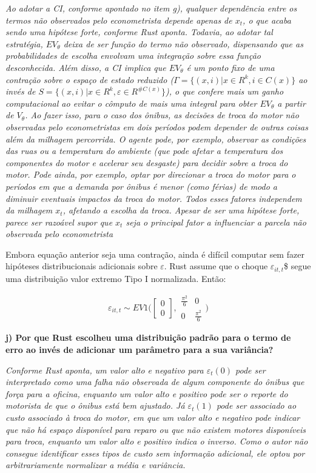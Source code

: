 \documentclass[12pt,a4paper]{article}
\begin{document}
\emph{Ao adotar a CI, conforme apontado no item g), qualquer dependência
entre os termos não observados pelo econometrista depende apenas de
\(x_t\), o que acaba sendo uma hipótese forte, conforme Rust aponta.
Todavia, ao adotar tal estratégia, \(EV_\theta\) deixa de ser função do
termo não observado, dispensando que as probabilidades de escolha
envolvam uma integração sobre essa função desconhecida. Além disso, a CI
implica que \(EV_\theta\) é um ponto fixo de uma contração sobre o
espaço de estado reduzido (\(\Gamma=\{(x,i)|x\in R^k, i \in C(x)\}\) ao
invés de \(S=\{(x,i)|x\in R^k, \varepsilon \in R^{\#C(x)}\}\)), o que
confere mais um ganho computacional ao evitar o cômputo de mais uma
integral para obter \(EV_\theta\) a partir de \(V_\theta\). Ao fazer
isso, para o caso dos ônibus, as decisões de troca do motor não
observadas pelo econometristas em dois períodos podem depender de outras
coisas além da milhagem percorrida. O agente pode, por exemplo, observar
as condições das ruas ou a temperatura do ambiente (que pode afetar a
temperatura dos componentes do motor e acelerar seu desgaste) para
decidir sobre a troca do motor. Pode ainda, por exemplo, optar por
direcionar a troca do motor para o períodos em que a demanda por ônibus
é menor (como férias) de modo a diminuir eventuais impactos da troca do
motor. Todos esses fatores independem da milhagem \(x_t\), afetando a
escolha da troca. Apesar de ser uma hipótese forte, parece ser razoável
supor que \(x_t\) seja o principal fator a influenciar a parcela não
observada pelo econometrista}

Embora equação anterior seja uma contração, ainda é difícil computar sem
fazer hipóteses distribucionais adicionais sobre \(\varepsilon\). Rust
assume que o choque \(\varepsilon_{it,t}\)\$ segue uma distribuição
valor extremo Tipo I normalizada. Então:

\[
\varepsilon_{it,t} \sim EV1 \Bigg( \begin{bmatrix} 
0   \\ 0 \end{bmatrix}, \begin{matrix} \frac{\pi^2}{6} & 0 \\ 0 & \frac{\pi^2}{6} \end{matrix} \Bigg) 
\]

\textbf{j) Por que Rust escolheu uma distribuição padrão para o termo de
erro ao invés de adicionar um parâmetro para a sua variância?}

\emph{Conforme Rust aponta, um valor alto e negativo para
\(\varepsilon_t(0)\) pode ser interpretado como uma falha não observada
de algum componente do ônibus que força para a oficina, enquanto um
valor alto e positivo pode ser o reporte do motorista de que o ônibus
está bem ajustado. Já \(\varepsilon_t(1)\) pode ser associado ao custo
associado à troca do motor, em que um valor alto e negativo pode indicar
que não há espaço disponível para reparo ou que não existem motores
disponíveis para troca, enquanto um valor alto e positivo indica o
inverso. Como o autor não consegue identificar esses tipos de custo sem
informação adicional, ele optou por arbitrariamente normalizar a média e
variância.}
\end{document}
